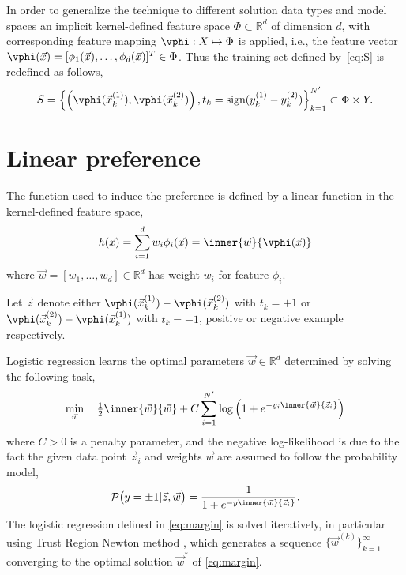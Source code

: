 In order to generalize the technique to different solution data types and model spaces an implicit kernel-defined feature space $\Phi\subset\mathbb{R}^d$ of dimension $d$, with corresponding feature mapping $\vphi:X\mapsto\Phi$ is applied, i.e., the feature vector $\vphi(\vec{x})=[\phi_1(\vec{x}),\ldots,\phi_d(\vec{x})]^T\in\Phi$. Thus the training set defined by~\eqref{eq:S} is redefined as follows,
\begin{equation}
S = \left\{\left(\vphi(\vec{x}_k^{(1)}), \vphi(\vec{x}_k^{(2)})\right),t_k=\text{sign}(y_k^{(1)} - y_k^{(2)})\right\}_{k=1}^{N'} \subset \Phi \times Y \label{eq:Sfeat}.
\end{equation}


\section{Linear preference}\label{sec:ord:linpref}
The function used to induce the preference is defined by a linear function in the kernel-defined feature space,
\begin{equation} 
 h(\vec{x})=\sum_{i=1}^d w_i\phi_i(\vec{x})=\inner{\vec{w}}{\vphi(\vec{x})} \label{eq:linearpref}
\end{equation}
where $\vec{w}=[w_1,\ldots,w_d]\in\mathbb{R}^d$ has weight $w_i$ for feature $\phi_i$.

Let $\vec{z}$ denote either $\vphi(\vec{x}_k^{(1)})-\vphi(\vec{x}_k^{(2)})$ with \mbox{$t_k=+1$} or 
$\vphi(\vec{x}_k^{(2)})-\vphi(\vec{x}_k^{(1)})$ with \mbox{$t_k=-1$}, positive or negative example respectively.

Logistic regression learns the optimal parameters $\vec{w}\in\mathbb{R}^d$ determined by solving the following task,
\begin{equation}\label{eq:margin}
\min_{\vec{w}}\quad \tfrac{1}{2}\inner{\vec{w}}{\vec{w}} + C \sum_{i=1}^{N'} \log\left(1 + e^{-y_i \inner{\vec{w}}{\vec{z}_i}}\right) 
\end{equation}
where $C > 0$ is a penalty parameter, and the negative log-likelihood is due to the fact the given data point $\vec{z}_i$ and weights $\vec{w}$ are assumed to follow the probability model,
\begin{equation}\label{eq:prob}
\mathcal{P}\big(y=\pm1|\vec{z},\vec{w}\big)=\frac{1}{1+e^{-y\inner{\vec{w}}{\vec{z}_i}}}.
\end{equation}
The logistic regression defined in \eqref{eq:margin} is solved iteratively, in particular using Trust Region Newton method \citep[cf.][]{Lin08:newtontrustregion}, which generates a sequence $\{\vec{w}^{(k)}\}_{k=1}^\infty$ converging to the optimal solution $\vec{w}^*$ of \eqref{eq:margin}.

